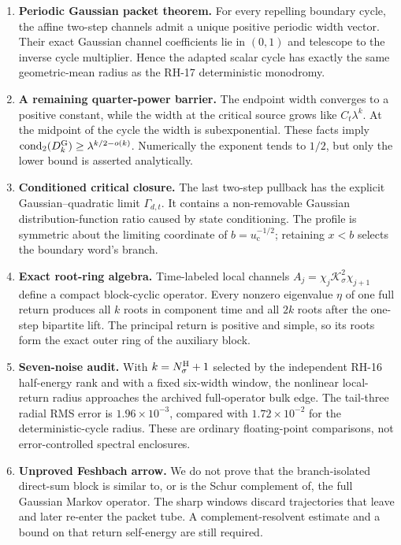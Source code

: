 \documentclass[11pt]{article}
\theoremstyle{definition}
\theoremstyle{remark}
\newcommand{\uc}{u_{\mathrm c}}
\newcommand{\cK}{\mathcal K}
\newcommand{\cond}{\operatorname{cond}_2}
\begin{document}
\begin{enumerate}[label=\textbf{G\arabic*.},leftmargin=3.2em]
 \item \textbf{Periodic Gaussian packet theorem.}
 For every repelling boundary cycle, the affine two-step channels admit a
 unique positive periodic width vector.  Their exact Gaussian channel
 coefficients lie in $(0,1)$ and telescope to the inverse cycle multiplier.
 Hence the adapted scalar cycle has exactly the same geometric-mean radius
 as the RH-17 deterministic monodromy.

 \item \textbf{A remaining quarter-power barrier.}
 The endpoint width converges to a positive constant, while the width at the
 critical source grows like $C_t\lambda^k$.  At the midpoint of the cycle the
 width is subexponential.  These facts imply
 $\cond(D_k^{\rm G})\ge\lambda^{k/2-o(k)}$.  Numerically the exponent tends
 to $1/2$, but only the lower bound is asserted analytically.

 \item \textbf{Conditioned critical closure.}
 The last two-step pullback has the explicit Gaussian--quadratic limit
 $\Gamma_{d,t}$.  It contains a non-removable Gaussian distribution-function
 ratio caused by state conditioning.  The profile is symmetric about the
 limiting coordinate of $b=\uc^{-1/2}$; retaining $x<b$ selects the boundary
 word's branch.

 \item \textbf{Exact root-ring algebra.}
 Time-labeled local channels
 $A_j=\chi_j\cK_\sigma^2\chi_{j+1}$ define a compact block-cyclic operator.
 Every nonzero eigenvalue $\eta$ of one full return produces all $k$ roots in
 component time and all $2k$ roots after the one-step bipartite lift.  The
 principal return is positive and simple, so its roots form the exact outer
 ring of the auxiliary block.

 \item \textbf{Seven-noise audit.}
 With $k=N_\sigma^{\rm H}+1$ selected by the independent RH-16 half-energy
 rank and with a fixed six-width window, the nonlinear local-return radius
 approaches the archived full-operator bulk edge.  The tail-three radial RMS
 error is $1.96\times10^{-3}$, compared with $1.72\times10^{-2}$ for the
 deterministic-cycle radius.  These are ordinary floating-point comparisons,
 not error-controlled spectral enclosures.

 \item \textbf{Unproved Feshbach arrow.}
 We do not prove that the branch-isolated direct-sum block is similar to, or
 is the Schur complement of, the full Gaussian Markov operator.  The sharp
 windows discard trajectories that leave and later re-enter the packet tube.
 A complement-resolvent estimate and a bound on that return self-energy are
 still required.
\end{enumerate}
\end{document}
